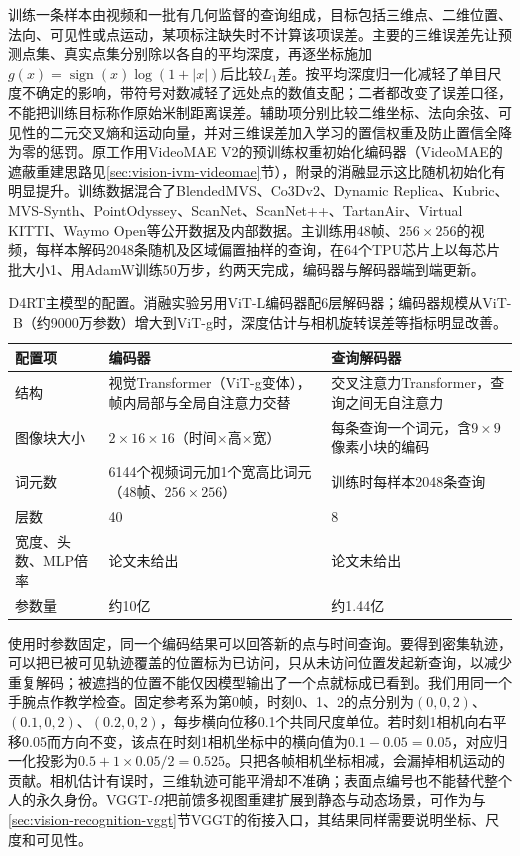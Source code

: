 训练一条样本由视频和一批有几何监督的查询组成，目标包括三维点、二维位置、法向、可见性或点运动，某项标注缺失时不计算该项误差。主要的三维误差先让预测点集、真实点集分别除以各自的平均深度，再逐坐标施加$g(x)=\operatorname{sign}(x)\log(1+|x|)$后比较$L_1$差。按平均深度归一化减轻了单目尺度不确定的影响，带符号对数减轻了远处点的数值支配；二者都改变了误差口径，不能把训练目标称作原始米制距离误差。辅助项分别比较二维坐标、法向余弦、可见性的二元交叉熵和运动向量，并对三维误差加入学习的置信权重及防止置信全降为零的惩罚。原工作用VideoMAE V2的预训练权重初始化编码器（VideoMAE的遮蔽重建思路见\ref{sec:vision-ivm-videomae}节），附录的消融显示这比随机初始化有明显提升。训练数据混合了BlendedMVS、Co3Dv2、Dynamic Replica、Kubric、MVS-Synth、PointOdyssey、ScanNet、ScanNet++、TartanAir、Virtual KITTI、Waymo Open等公开数据及内部数据。主训练用48帧、$256\times256$的视频，每样本解码2048条随机及区域偏置抽样的查询，在64个TPU芯片上以每芯片批大小1、用AdamW训练50万步，约两天完成，编码器与解码器端到端更新。

\begin{table}[htbp]
  \centering
  \small
  \begin{tabularx}{\linewidth}{@{}lXX@{}}
    \toprule
    配置项 & 编码器 & 查询解码器\\
    \midrule
    结构 & 视觉Transformer（ViT-g变体），帧内局部与全局自注意力交替 & 交叉注意力Transformer，查询之间无自注意力\\
    图像块大小 & $2\times16\times16$（时间$\times$高$\times$宽） & 每条查询一个词元，含$9\times9$像素小块的编码\\
    词元数 & 6144个视频词元加1个宽高比词元（48帧、$256\times256$） & 训练时每样本2048条查询\\
    层数 & 40 & 8\\
    宽度、头数、MLP倍率 & 论文未给出 & 论文未给出\\
    参数量 & 约10亿 & 约1.44亿\\
    \bottomrule
  \end{tabularx}
  \caption{D4RT主模型的配置。消融实验另用ViT-L编码器配6层解码器；编码器规模从ViT-B（约9000万参数）增大到ViT-g时，深度估计与相机旋转误差等指标明显改善。}
  \label{tab:vision-video-d4rt-config}
\end{table}

使用时参数固定，同一个编码结果可以回答新的点与时间查询。要得到密集轨迹，可以把已被可见轨迹覆盖的位置标为已访问，只从未访问位置发起新查询，以减少重复解码；被遮挡的位置不能仅因模型输出了一个点就标成已看到。我们用同一个手腕点作教学检查。固定参考系为第0帧，时刻0、1、2的点分别为$(0,0,2)$、$(0.1,0,2)$、$(0.2,0,2)$，每步横向位移0.1个共同尺度单位。若时刻1相机向右平移0.05而方向不变，该点在时刻1相机坐标中的横向值为$0.1-0.05=0.05$，对应归一化投影为$0.5+1\times0.05/2=0.525$。只把各帧相机坐标相减，会漏掉相机运动的贡献。相机估计有误时，三维轨迹可能平滑却不准确；表面点编号也不能替代整个人的永久身份。VGGT-$\Omega$把前馈多视图重建扩展到静态与动态场景，可作为与\ref{sec:vision-recognition-vggt}节VGGT的衔接入口，其结果同样需要说明坐标、尺度和可见性。

